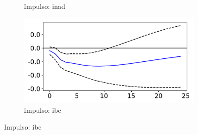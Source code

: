 \documentclass[a4paper,
               article,
               12pt,
               openany,
               oneside,
               english,
               brazil]{abntex2}
\numberwithin{equation}{section}
\begin{document}
\begin{figure}[h!bt]
\begin{subfigure}[t]{.5\linewidth}
            \caption{Impulso: inad}
        \end{subfigure}
        \begin{subfigure}[t]{.5\linewidth}
            \includegraphics[width = \textwidth, scale=1]{irf/orth_spread_ibc.pdf}
            \caption{Impulso: ibc}
        \end{subfigure}
    \end{figure}





\newpage
\printbibliography
\end{document}
